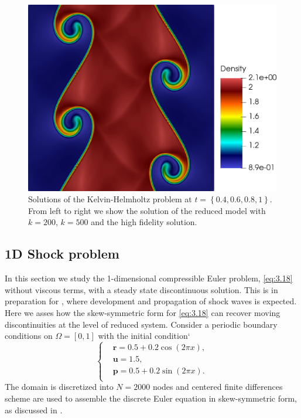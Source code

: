 \begin{figure}[h!]
\includegraphics[scale=0.115]{data/Compressible_Euler/KH/Snapshots/density_exact_768.png}

\caption{Solutions of the Kelvin-Helmholtz problem at $t=\left\{ 0.4, 0.6, 0.8, 1 \right\}$. From left to right we show the solution of the reduced model with $k=200$, $k=500$ and the high fidelity solution.}
\label{fig:snap_solution_KH}
\end{figure}


\subsection{1D Shock problem}
In this section we study the 1-dimensional compressible Euler problem, \eqref{eq:3.18} without viscous terms, with a steady state discontinuous solution. This is in preparation for , where development and propagation of shock waves is expected. Here we asses how the skew-symmetric form for \eqref{eq:3.18} can recover moving discontinuities at the level of reduced system. Consider a periodic boundary conditions on $\Omega = [0,1]$ with the initial condition`
\begin{equation*}
\begin{cases}
& \mathbf{r} = 0.5+0.2 \cos(2\pi x),\\
& \mathbf{u} = 1.5,\\
& \mathbf{p} = 0.5+0.2 \sin(2\pi x).\\
\end{cases}
\end{equation*}
The domain is discretized into $N=2000$ nodes and centered finite differences scheme are used to assemble the discrete Euler equation in skew-symmetric form, as discussed in . 

